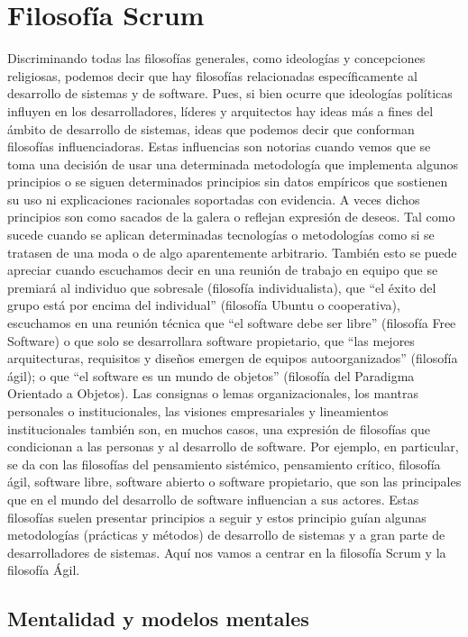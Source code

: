 \chapter{Filosofía Scrum}

Discriminando todas las filosofías generales, como ideologías y concepciones religiosas, podemos decir que hay filosofías relacionadas específicamente al desarrollo de sistemas y de software. Pues, si bien ocurre que ideologías políticas influyen en los desarrolladores, líderes y arquitectos hay ideas más a fines del ámbito de desarrollo de sistemas, ideas que podemos decir que conforman filosofías influenciadoras. Estas influencias son notorias cuando vemos que se toma una decisión de usar una determinada metodología que implementa algunos principios o se siguen determinados principios sin datos empíricos que sostienen su uso ni explicaciones racionales soportadas con evidencia. A veces dichos principios son como sacados de la galera o reflejan expresión de deseos. Tal como sucede cuando se aplican determinadas tecnologías o metodologías como si se tratasen de una moda o de algo aparentemente arbitrario. También esto se puede apreciar cuando escuchamos decir en una reunión de trabajo en equipo que se premiará al individuo que sobresale (filosofía individualista), que “el éxito del grupo está por encima del individual” (filosofía Ubuntu o cooperativa), escuchamos en una reunión técnica que “el software debe ser libre” (filosofía Free Software) o que solo se desarrollara software propietario, que “las mejores arquitecturas, requisitos y diseños emergen de equipos autoorganizados” \cite{Beck-2001} (filosofía ágil); o que “el software es un mundo de objetos” (filosofía del Paradigma Orientado a Objetos). Las consignas o lemas organizacionales, los mantras personales o institucionales, las visiones empresariales y lineamientos institucionales también son, en muchos casos, una expresión de filosofías que condicionan a las personas y al desarrollo de software. Por ejemplo, en particular, se da con las filosofías del pensamiento sistémico, pensamiento crítico, filosofía ágil, software libre, software abierto o software propietario, que son las principales que en el mundo del desarrollo de software influencian a sus actores. Estas filosofías suelen presentar principios a seguir y estos principio guían algunas metodologías (prácticas y métodos) de desarrollo de sistemas y a gran parte de desarrolladores de sistemas. Aquí nos vamos a centrar en la filosofía Scrum y la filosofía Ágil.

\section{Mentalidad y modelos mentales}

